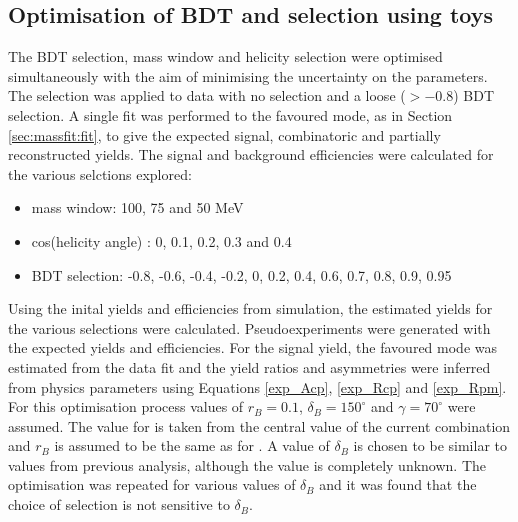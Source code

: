 \subsection{Optimisation of BDT and \Kstar selection using toys}
\label{sec:cpfit:optimisation}

The BDT selection, \Kstar mass window and \KS helicity selection were optimised simultaneously with the aim of minimising the uncertainty on the \CP parameters. The selection was applied to data with no \Kstar selection and a loose ($>-0.8$) BDT selection. A single fit was performed to the favoured mode, as in Section \ref{sec:massfit:fit}, to give the expected signal, combinatoric and partially reconstructed yields. The signal and background efficiencies were calculated for the various selctions explored:

\begin{itemize}
\item{\Kstar mass window: 100, 75 and 50 MeV}
\item{\textbar cos(\KS helicity angle) \textbar : 0, 0.1, 0.2, 0.3 and 0.4}
\item{BDT selection: -0.8, -0.6, -0.4, -0.2, 0, 0.2, 0.4, 0.6, 0.7, 0.8, 0.9, 0.95}
\end{itemize}

Using the inital yields and efficiencies from simulation, the estimated yields for the various selections were calculated. Pseudoexperiments were generated with the expected yields and efficiencies. For the signal yield, the favoured mode was estimated from the data fit and the yield ratios and asymmetries were inferred from physics parameters using Equations \ref{exp_Acp}, \ref{exp_Rcp} and \ref{exp_Rpm}. For this optimisation process values of $r_B = 0.1$, $\delta_B = 150^{\circ}$ and $\gamma = 70^{\circ}$ were assumed. The value for \Pgamma is taken from the central value of the current \lhcb combination and $r_B$ is assumed to be the same as for \decay{\B}{\D\kaon}. A value of $\delta_B$ is chosen to be similar to values from previous analysis, although the value is completely unknown. The optimisation was repeated for various values of $\delta_B$ and it was found that the choice of selection is not sensitive to $\delta_B$.

